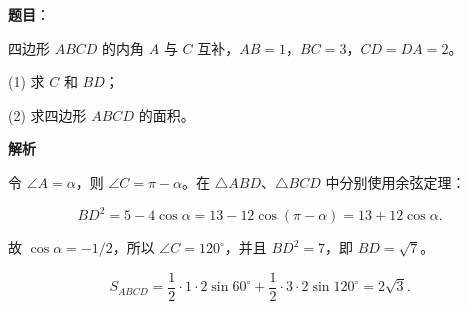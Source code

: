 \begin{answer}

\textbf{题目}：

四边形 $ABCD$ 的内角 $A$ 与 $C$ 互补，$AB=1$，$BC=3$，$CD=DA=2$。

(1) 求 $C$ 和 $BD$；

(2) 求四边形 $ABCD$ 的面积。

\textbf{解析}


令 $\angle A=\alpha$，则 $\angle C=\pi-\alpha$。在 $\triangle ABD$、$\triangle BCD$ 中分别使用余弦定理：

\nopagebreak[4]
\[
BD^2=5-4\cos\alpha=13-12\cos(\pi-\alpha)=13+12\cos\alpha.
\]

故 $\cos\alpha=-1/2$，所以 $\angle C=120^\circ$，并且 $BD^2=7$，即 $BD=\sqrt7$。


\nopagebreak[4]
\[
S_{ABCD}=\frac12\cdot1\cdot2\sin60^\circ+\frac12\cdot3\cdot2\sin120^\circ=2\sqrt3.
\]



\end{answer}
